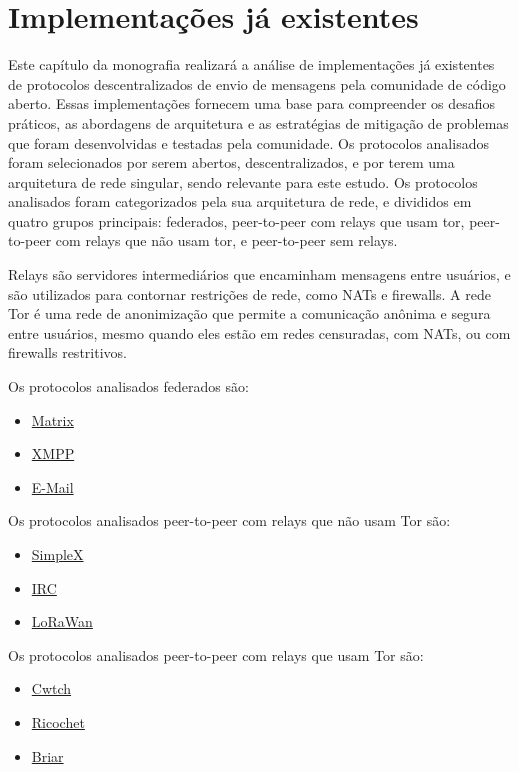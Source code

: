 
\chapter{Implementações já existentes}

Este capítulo da monografia realizará a análise de implementações já existentes de protocolos descentralizados de envio de mensagens pela comunidade de código aberto. Essas implementações fornecem uma base para compreender os desafios práticos, as abordagens de arquitetura e as estratégias de mitigação de problemas que foram desenvolvidas e testadas pela comunidade. Os protocolos analisados foram selecionados por serem abertos, descentralizados, e por terem uma arquitetura de rede singular, sendo relevante para este estudo. Os protocolos analisados foram categorizados pela sua arquitetura de rede, e divididos em quatro grupos principais: federados, peer-to-peer com relays que usam tor, peer-to-peer com relays que não usam tor, e peer-to-peer sem relays. 

Relays são servidores intermediários que encaminham mensagens entre usuários, e são utilizados para contornar restrições de rede, como NATs e firewalls. A rede Tor é uma rede de anonimização que permite a comunicação anônima e segura entre usuários, mesmo quando eles estão em redes censuradas, com NATs, ou com firewalls restritivos.

Os protocolos analisados federados são:
\begin{itemize}
  \item \href{https://matrix.org/}{Matrix}
  \item \href{https://xmpp.org/}{XMPP}
  \item \href{https://datatracker.ietf.org/doc/html/rfc5321}{E-Mail}
\end{itemize}

Os protocolos analisados peer-to-peer com relays que não usam Tor são:
\begin{itemize}
  \item \href{https://simplex.chat/}{SimpleX}
  \item \href{https://datatracker.ietf.org/doc/html/rfc2810}{IRC}
  \item \href{https://lora-alliance.org/}{LoRaWan}
\end{itemize}

Os protocolos analisados peer-to-peer com relays que usam Tor são:
\begin{itemize}
  \item \href{https://cwtch.im/}{Cwtch}
  \item \href{https://ricochet.im/}{Ricochet}
  \item \href{https://briarproject.org/}{Briar}
\end{itemize}

